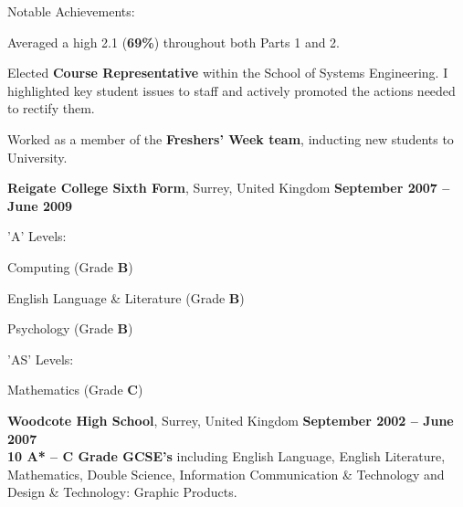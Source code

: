 \documentclass[margin,line,a4paper]{resume}
\begin{document}
\begin{resume}
\begin{list2}
	\item Notable Achievements:
	\vspace{1mm}%
		\begin{list3}
			\item Averaged a high 2.1 (\textbf{69\%}) throughout both Parts 1 and 2.
			\item Elected \textbf{Course Representative} within the School of Systems Engineering. I highlighted key student issues to staff and actively promoted the actions needed to rectify them.
			\item Worked as a member of the \textbf{Freshers' Week team}, inducting new students to University.
		\end{list3}
    	\end{list2}

	\vspace{-1mm}%

	\addtolength{\linewidth}{7mm}

    	\textbf{Reigate College Sixth Form}, Surrey, United Kingdom		\hfill		\textbf{ September 2007 -- June 2009} 			
	\vspace{2mm}\\
	\vspace{-8mm}%
		\begin{multicols}{2}
			\begin{list2}
        			\item 'A' Levels:
					\begin{list3}
						\item Computing (Grade \textbf{B})
						\item English Language \& Literature (Grade \textbf{B})
						\columnbreak
						\item Psychology (Grade \textbf{B})
					\end{list3}
				\item 'AS' Levels:
					\begin{list3}
						\item Mathematics (Grade \textbf{C})
					\end{list3}
			\end{list2}
		\end{multicols}
	\vspace{-5mm}%

    	\textbf{Woodcote High School}, Surrey, United Kingdom	\hfill		\textbf{ September 2002 -- June 2007} 			\vspace{3mm}\\
	\vspace{1mm}%
	\textbf{10 A* -- C Grade GCSE’s} including English Language, English Literature, Mathematics, Double Science, Information Communication \& Technology and Design \& Technology: Graphic Products.	
	\vspace{1mm}


\end{resume}
\end{document}
